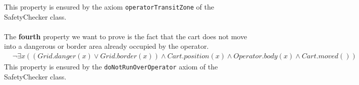This property is ensured by the axiom \texttt{operatorTransitZone} of the SafetyChecker class.
\\ \\
The \textbf{fourth} property we want to prove is the fact that the cart does not move into a dangerous or border area already occupied by the operator.
\begin{align*}
  &\neg \exists x ((Grid.danger (x) \lor Grid.border(x)) \land Cart.position(x) \land Operator.body(x) \land Cart.moved())
\end{align*}
This property is ensured by the \texttt{doNotRunOverOperator} axiom of the SafetyChecker class.
















